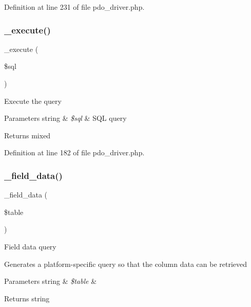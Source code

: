 Definition at line 231 of file pdo\+\_\+driver.\+php.

\mbox{\label{class_c_i___d_b__pdo__driver_a114ab675d89bf8324a41785fb475e86d}} 
\subsubsection{\texorpdfstring{\_execute()}{\_execute()}}
{\footnotesize\ttfamily \+\_\+execute (\begin{DoxyParamCaption}\item[{}]{\$sql }\end{DoxyParamCaption})\hspace{0.3cm}{\ttfamily [protected]}}

Execute the query


\begin{DoxyParams}[1]{Parameters}
string & {\em \$sql} & S\+QL query \\
\hline
\end{DoxyParams}
\begin{DoxyReturn}{Returns}
mixed 
\end{DoxyReturn}


Definition at line 182 of file pdo\+\_\+driver.\+php.

\mbox{\label{class_c_i___d_b__pdo__driver_a95247d9671893adc3444cb184ad32ea1}} 
\subsubsection{\texorpdfstring{\_field\_data()}{\_field\_data()}}
{\footnotesize\ttfamily \+\_\+field\+\_\+data (\begin{DoxyParamCaption}\item[{}]{\$table }\end{DoxyParamCaption})\hspace{0.3cm}{\ttfamily [protected]}}

Field data query

Generates a platform-\/specific query so that the column data can be retrieved


\begin{DoxyParams}[1]{Parameters}
string & {\em \$table} & \\
\hline
\end{DoxyParams}
\begin{DoxyReturn}{Returns}
string 
\end{DoxyReturn}


